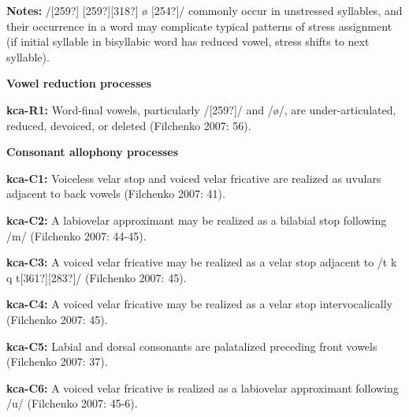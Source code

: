 \begin{styleBody}
\textbf{Notes:} /[259?] [259?][318?] ø [254?]/ commonly occur in unstressed syllables, and their occurrence in a word may complicate typical patterns of stress assignment (if initial syllable in bisyllabic word has reduced vowel, stress shifts to next syllable).
\end{styleBody}

\begin{styleBody}
\textbf{Vowel reduction processes}
\end{styleBody}

\begin{styleBody}
\textbf{kca-R1:} Word-final vowels, particularly /[259?]/ and /ø/, are under-articulated, reduced, devoiced, or deleted (Filchenko 2007: 56).
\end{styleBody}

\begin{styleBody}
\textbf{Consonant allophony processes}
\end{styleBody}

\begin{styleBody}
\textbf{kca-C1: }Voiceless velar stop and voiced velar fricative are realized as uvulars adjacent to back vowels (Filchenko 2007: 41).
\end{styleBody}

\begin{styleBody}
\textbf{kca-C2: }A labiovelar approximant may be realized as a bilabial stop following /m/ (Filchenko 2007: 44-45).
\end{styleBody}

\begin{styleBody}
\textbf{kca-C3: }A voiced velar fricative may be realized as a velar stop adjacent to /t k q t[361?][283?]/ (Filchenko 2007: 45).
\end{styleBody}

\begin{styleBody}
\textbf{kca-C4: }A voiced velar fricative may be realized as a velar stop intervocalically (Filchenko 2007: 45).
\end{styleBody}

\begin{styleBody}
\textbf{kca-C5: }Labial and dorsal consonants are palatalized preceding front vowels (Filchenko 2007: 37).
\end{styleBody}

\begin{styleBody}
\textbf{kca-C6: }A voiced velar fricative is realized as a labiovelar approximant following /u/ (Filchenko 2007: 45-6).
\end{styleBody}

